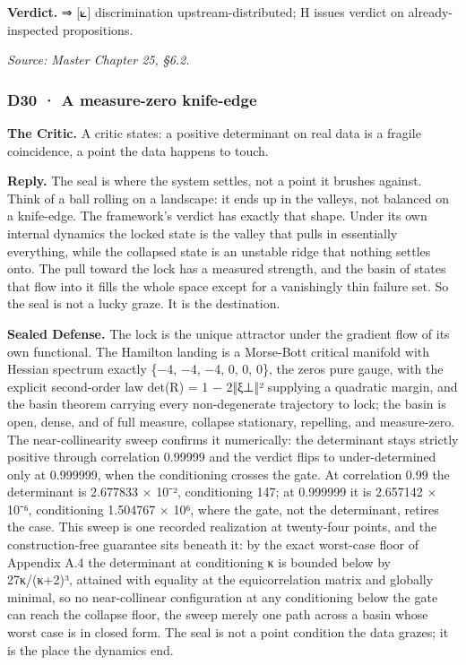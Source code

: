 \documentclass[10pt,twocolumn]{article}
\begin{document}
\textbf{Verdict.} ⇒ {[}⟀{]} discrimination upstream-distributed; H
issues verdict on already-inspected propositions.

\emph{Source: Master Chapter 25, §6.2.}

\hypertarget{d30-a-measure-zero-knife-edge}{%
\subsubsection{D30 · A measure-zero
knife-edge}\label{d30-a-measure-zero-knife-edge}}

\textbf{The Critic.} A critic states: a positive determinant on real
data is a fragile coincidence, a point the data happens to touch.

\textbf{Reply.} The seal is where the system settles, not a point it
brushes against. Think of a ball rolling on a landscape: it ends up in
the valleys, not balanced on a knife-edge. The framework's verdict has
exactly that shape. Under its own internal dynamics the locked state is
the valley that pulls in essentially everything, while the collapsed
state is an unstable ridge that nothing settles onto. The pull toward
the lock has a measured strength, and the basin of states that flow into
it fills the whole space except for a vanishingly thin failure set. So
the seal is not a lucky graze. It is the destination.

\textbf{Sealed Defense.} The lock is the unique attractor under the
gradient flow of its own functional. The Hamilton landing is a
Morse-Bott critical manifold with Hessian spectrum exactly \{−4, −4, −4,
0, 0, 0\}, the zeros pure gauge, with the explicit second-order law
det(R) = 1 − 2‖ξ⊥‖² supplying a quadratic margin, and the basin theorem
carrying every non-degenerate trajectory to lock; the basin is open,
dense, and of full measure, collapse stationary, repelling, and
measure-zero. The near-collinearity sweep confirms it numerically: the
determinant stays strictly positive through correlation 0.99999 and the
verdict flips to under-determined only at 0.999999, when the
conditioning crosses the gate. At correlation 0.99 the determinant is
2.677833 × 10⁻², conditioning 147; at 0.999999 it is 2.657142 × 10⁻⁶,
conditioning 1.504767 × 10⁶, where the gate, not the determinant,
retires the case. This sweep is one recorded realization at twenty-four
points, and the construction-free guarantee sits beneath it: by the
exact worst-case floor of Appendix A.4 the determinant at conditioning κ
is bounded below by 27κ/(κ+2)³, attained with equality at the
equicorrelation matrix and globally minimal, so no near-collinear
configuration at any conditioning below the gate can reach the collapse
floor, the sweep merely one path across a basin whose worst case is in
closed form. The seal is not a point condition the data grazes; it is
the place the dynamics end.
\end{document}
